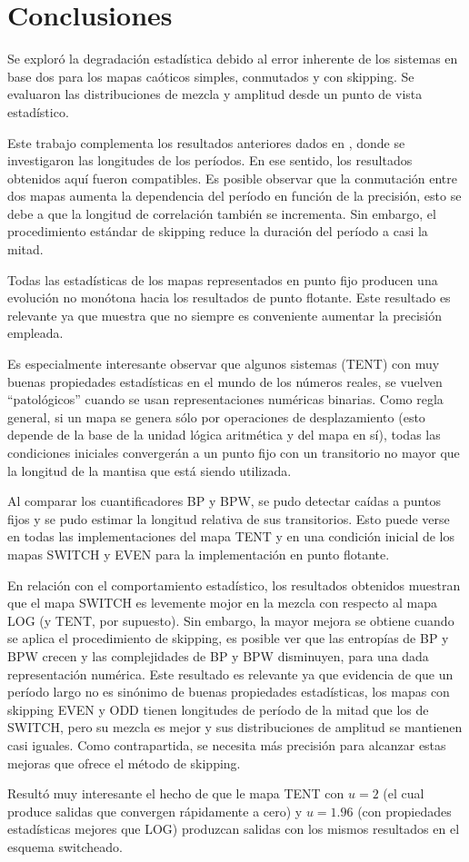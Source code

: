 \section{Conclusiones}

Se exploró la degradación estadística debido al error inherente de los sistemas en base dos para los mapas caóticos simples, conmutados y con skipping.
Se evaluaron las distribuciones de mezcla y amplitud desde un punto de vista estadístico.

Este trabajo complementa los resultados anteriores dados en \cite{Nagaraj2008}, donde se investigaron las longitudes de los períodos.
En ese sentido, los resultados obtenidos aquí fueron compatibles.
Es posible observar que la conmutación entre dos mapas aumenta la dependencia del período en función de la precisión, esto se debe a que la longitud de correlación también se incrementa.
Sin embargo, el procedimiento estándar de skipping reduce la duración del período a casi la mitad.

Todas las estadísticas de los mapas representados en punto fijo producen una evolución no monótona hacia los resultados de punto flotante.
Este resultado es relevante ya que muestra que no siempre es conveniente aumentar la precisión empleada.

Es especialmente interesante observar que algunos sistemas (TENT) con muy buenas propiedades estadísticas en el mundo de los números reales, se vuelven ``patológicos'' cuando se usan representaciones numéricas binarias.
Como regla general, si un mapa se genera sólo por operaciones de desplazamiento (esto depende de la base de la unidad lógica aritmética y del mapa en sí), todas las condiciones iniciales convergerán a un punto fijo con un transitorio no mayor que la longitud de la mantisa que está siendo utilizada.

Al comparar los cuantificadores BP y BPW, se pudo detectar caídas a puntos fijos y se pudo estimar la longitud relativa de sus transitorios.
Esto puede verse en todas las implementaciones del mapa TENT y en una condición inicial de los mapas SWITCH y EVEN para la implementación en punto flotante.

En relación con el comportamiento estadístico, los resultados obtenidos muestran que el mapa SWITCH es levemente mojor en la mezcla con respecto al mapa LOG (y TENT, por supuesto).
Sin embargo, la mayor mejora se obtiene cuando se aplica el procedimiento de skipping, es posible ver que las entropías de BP y BPW crecen y las complejidades de BP y BPW disminuyen, para una dada representación numérica.
Este resultado es relevante ya que evidencia de que un período largo no es sinónimo de buenas propiedades estadísticas, los mapas con skipping EVEN y ODD tienen longitudes de período de la mitad que los de SWITCH, pero su mezcla es mejor y sus distribuciones de amplitud se mantienen casi iguales.
Como contrapartida, se necesita más precisión para alcanzar estas mejoras que ofrece el método de skipping.

Resultó muy interesante el hecho de que le mapa TENT con $u=2$ (el cual produce salidas que convergen rápidamente a cero) y $u=1.96$ (con propiedades estadísticas mejores que LOG) produzcan salidas con los mismos resultados en el esquema switcheado.